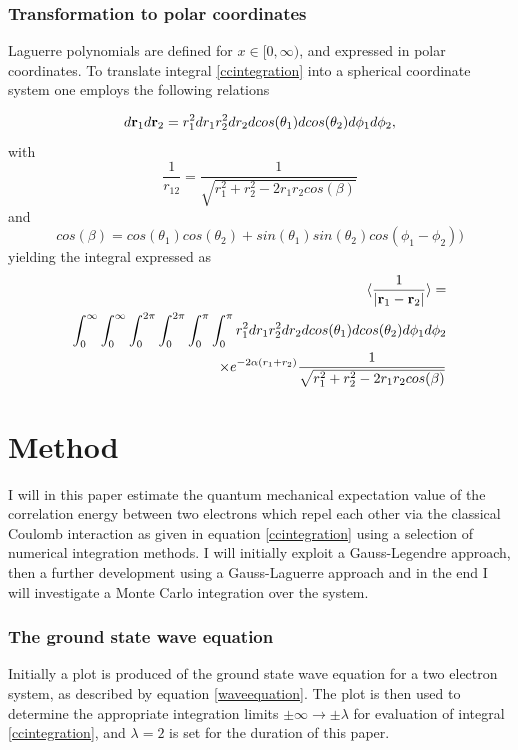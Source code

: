 \documentclass[%
reprint,
amsmath,amssymb,
aps,
]{revtex4-1}
\begin{document}
\subsubsection*{Transformation to polar coordinates}  
Laguerre polynomials are defined for $x\in[0,\infty)$, and expressed in polar coordinates. To translate integral \ref{ccintegration} into a spherical coordinate system one employs the following relations

\begin{equation*}
	d{\bf r}_1d{\bf r}_2  = r_1^2dr_1 r_2^2dr_2 dcos(\theta_1)dcos(\theta_2)d\phi_1d\phi_2,
\end{equation*}
with
\begin{equation*}
	\frac{1}{r_{12}}= \frac{1}{\sqrt{r_1^2+r_2^2-2r_1r_2cos(\beta)}}
\end{equation*}
and 
\begin{equation}
	cos(\beta) = cos(\theta_1)cos(\theta_2)+sin(\theta_1)sin(\theta_2)cos(\phi_1-\phi_2))
\end{equation}
yielding the integral expressed as \\ 
\begin{align}\label{cpintegration}
	\langle \frac{1}{\abs{{\bf r}_1-{\bf r}_2}} \rangle =& \nonumber \\ 
	\int_{0}^{\infty}\int_{0}^{\infty}\int_{0}^{2\pi}\int_{0}^{2\pi}\int_{0}^{\pi}\int_{0}^{\pi}
	r_1^2dr_1 r_2^2dr_2 dcos(\theta_1)dcos(\theta_2)d\phi_1d\phi_2 & \nonumber \\ 
	\times e^{-2\alpha (r_1+r_2)}\frac{1}{\sqrt{r_1^2+r_2^2-2r_1r_2cos(\beta)}}
\end{align}


\vspace{10mm}
\newpage 
\section{Method}\noindent 
I will in this paper estimate the quantum mechanical expectation value of the correlation energy between two electrons which repel each other via the classical Coulomb interaction as given in equation \ref{ccintegration} using a selection of numerical integration methods. I will initially exploit a Gauss-Legendre approach, then a further development using a Gauss-Laguerre approach and in the end I will investigate a Monte Carlo integration over the system. 
\subsubsection*{The ground state wave equation} \noindent 
Initially a plot is produced of the ground state wave equation for a two electron system, as described by equation \ref{waveequation}. The plot is then used to determine the appropriate integration limits $\pm \infty \rightarrow \pm \lambda$ for evaluation of integral \ref{ccintegration}, and $\lambda = 2$ is set for the duration of this paper.  
\end{document}
